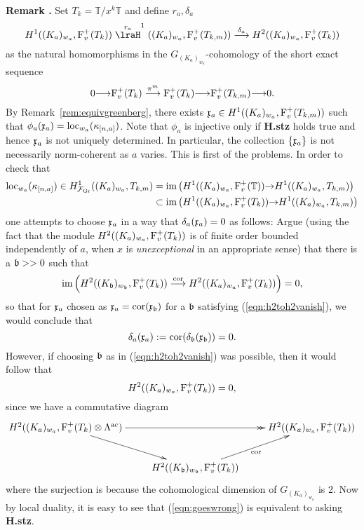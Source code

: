 \documentclass[12pt]{amsart}
\numberwithin{equation}{section}
\newenvironment{rem}{\par\medskip\noindent\refstepcounter{thm}
\bgroup{\hspace*{-0.15 cm}\bf{Remark} \thethm.}\bgroup}{\egroup
\egroup\par\medskip} \parskip 2pt
\begin{document}
\begin{rem}
Set $T_k={\mathbb{T}}/x^k{\mathbb{T}}$ and define $r_a,\delta_a$
$$H^1((K_{a})_{w_{a}},\textup{F}_v^+(T_{k}))\stackrel{r_a}\lraH^1((K_a)_{w_a},\textup{F}_v^+(T_{k,m}))\stackrel{\delta_a}{\longrightarrow} H^2((K_a)_{w_a},\textup{F}_v^+(T_{k}))$$
as  the natural homomorphisms in the $G_{(K_a)_{w_a}}$-cohomology of the short exact sequence
$$0{\longrightarrow} \textup{F}_v^+(T_k)\stackrel{\pi^m}{\longrightarrow}\textup{F}_v^+(T_k){\longrightarrow} \textup{F}_v^+(T_{k,m}){\longrightarrow} 0.$$
By Remark~\ref{rem:equivgreenberg}, there exists $\frak{x}_a\in H^1((K_a)_{w_a},\textup{F}_v^+(T_{k,m}))$ such that
$\phi_a(\frak{x}_a)=\textup{loc}_{w_a}(\kappa_{[n,a]})$. Note that $\phi_a$ is injective only if \textbf{H.stz} holds true and hence $\frak{x}_a$ is not uniquely determined. In particular, the collection $\{\frak{x}_a\}$ is not necessarily norm-coherent as $a$ varies. This is first of the problems. In order to check that
\begin{align*}
\textup{loc}_{w_a}(\kappa_{[n,a]}) \in H^1_{{\mathcal{F}}_{\textup{Gr}}}((K_a)_{w_a},T_{k,m})&=\textup{im}\left(H^1((K_{a})_{w_{a}},\textup{F}_v^+({\mathbb{T}})){\rightarrow} H^1((K_a)_{w_a},T_{k,m})\right)\\
&\subset \textup{im}\left(H^1((K_{a})_{w_{a}},\textup{F}_v^+(T_{k})){\rightarrow} H^1((K_a)_{w_a},T_{k,m})\right)
\end{align*}
one attempts to choose $\frak{x}_a$ in a way that $\delta_a(\frak{x}_a)=0$ as follows: Argue (using the fact that the module  $H^2((K_a)_{w_a},\textup{F}_v^+(T_{k}))$ is of finite order bounded independently of $a$, when $x$ is \emph{unexceptional} in an appropriate sense) that there is a $\frak{b}>>0$ such that
\begin{equation}\label{eqn:h2toh2vanish}
\textup{im}\left(H^2((K_{\frak{b}})_{w_{\frak{b}}},\textup{F}_v^+(T_{k}))\stackrel{\textup{cor}}{\longrightarrow} H^2((K_{a})_{w_{a}},\textup{F}_v^+(T_{k}))\right)=0,
\end{equation}
so that for $\frak{x}_a$ chosen as $\frak{x}_a=\textup{cor}(\frak{x}_{\frak{b}})$ for a $\frak{b}$ satisfying (\ref{eqn:h2toh2vanish}), we would conclude that $$\delta_a(\frak{x}_a):=\textup{cor}(\delta_{\frak{b}}(\frak{x}_{\frak{b}}))=0.$$
However, if choosing $\frak{b}$ as in (\ref{eqn:h2toh2vanish}) was possible, then it would follow that \begin{equation}\label{eqn:goeswrong}H^2((K_{a})_{w_{a}},\textup{F}_v^+(T_{k}))=0,\end{equation}
since we have a commutative diagram
$$\xymatrix{H^2((K_{a})_{w_{a}},\textup{F}_v^+(T_{k})\otimes{\Lambda}^{\textup{ac}})\ar[rd]\ar@{->>}[rr]&&H^2((K_{a})_{w_{a}},\textup{F}_v^+(T_{k}))\\
&H^2((K_{\frak{b}})_{w_{\frak{b}}},\textup{F}_v^+(T_{k}))\ar[ur]_{\textup{cor}}&}$$
where the surjection is because the cohomological dimension of $G_{(K_{a})_{w_{a}}}$ is 2. Now by local duality, it is easy to see that (\ref{eqn:goeswrong}) is equivalent to asking \textbf{H.stz}.
\end{rem}
\end{document}

